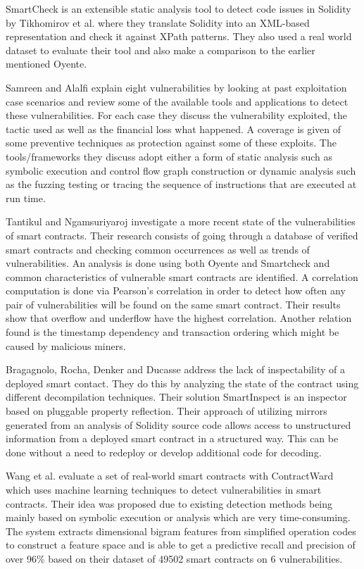 \documentclass[sigconf]{acmart}
\begin{document}
SmartCheck is an extensible static analysis tool to detect code issues in Solidity by Tikhomirov et al.\cite{smartcheck} where they translate Solidity into an XML-based representation and check it against XPath patterns. They also used a real world dataset to evaluate their tool and also make a comparison to the earlier mentioned Oyente. 


Samreen and Alalfi  \cite{survey} explain eight vulnerabilities by looking at past exploitation case scenarios and review some of the available tools and applications to detect these vulnerabilities. For each case they discuss the vulnerability exploited, the tactic used as well as the financial loss what happened. A coverage is given of some preventive techniques as protection against some of these exploits. The tools/frameworks they discuss adopt either a form of static analysis such as symbolic execution and control flow graph construction or dynamic analysis such as the fuzzing testing or tracing the sequence of instructions that are executed at run time. 

Tantikul and Ngamsuriyaroj \cite{icissp20} investigate a more recent state of the vulnerabilities of smart contracts. Their research consists of going through a database of verified smart contracts and checking common occurrences as well as trends of vulnerabilities. An analysis is done using both Oyente and Smartcheck and common characteristics of vulnerable smart contracts are identified. A correlation computation is done via Pearson's correlation in order to detect how often any pair of vulnerabilities will be found on the same smart contract. Their results show that overflow and underflow have the highest correlation. Another relation found is the timestamp dependency and transaction ordering which might be caused by malicious miners.  

Bragagnolo, Rocha, Denker and Ducasse \cite{rocha} address the lack of inspectability of a deployed smart contact. They do this by analyzing the state of the contract using different decompilation techniques. Their solution SmartInspect is an inspector based on pluggable property reflection. Their approach of utilizing mirrors generated from an analysis of Solidity source code allows access to unstructured information from a deployed smart contract in a structured way. This can be done without a need to redeploy or develop additional code for decoding. 

Wang et al. \cite{contractward} evaluate a set of real-world smart contracts with ContractWard which uses machine learning techniques to detect vulnerabilities in smart contracts. Their idea was proposed due to existing detection methods being mainly based on symbolic execution or analysis which are very time-consuming. The system extracts dimensional bigram features from simplified operation codes to construct a feature space and is able to get a predictive recall and precision of over 96\% based on their dataset of 49502 smart contracts on 6 vulnerabilities.
\end{document}
